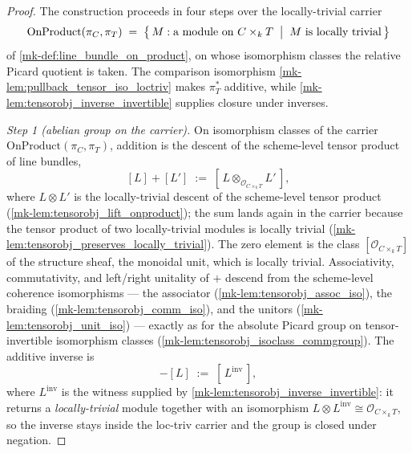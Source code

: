 \begin{proof}
  \leanok


The construction proceeds in four steps over the locally-trivial carrier
  \[
    \mathrm{OnProduct}(\pi_C, \pi_T) \;=\;
      \bigl\{\, M : \text{a module on } C \times_k T \;\bigm|\;
      M \text{ is locally trivial} \,\bigr\}
  \]
  of \ref{mk-def:line_bundle_on_product}, on whose isomorphism classes the
  relative Picard quotient is taken. The comparison isomorphism
  \ref{mk-lem:pullback_tensor_iso_loctriv} makes \(\pi_T^*\) additive, while
  \ref{mk-lem:tensorobj_inverse_invertible} supplies closure under inverses.

  \emph{Step 1 (abelian group on the carrier).} On isomorphism classes of the
  carrier \(\mathrm{OnProduct}(\pi_C, \pi_T)\), addition is the descent of the
  scheme-level tensor product of line bundles,
  \[
    [L] + [L'] \;:=\; [\, L \otimes_{\mathcal{O}_{C \times_k T}} L' \,],
  \]
  where \(L \otimes L'\) is the locally-trivial descent of the scheme-level
  tensor product (\ref{mk-lem:tensorobj_lift_onproduct}); the sum lands again in
  the carrier because the tensor product of two locally-trivial modules is
  locally trivial (\ref{mk-lem:tensorobj_preserves_locally_trivial}). The zero
  element is the class \([\mathcal{O}_{C \times_k T}]\) of the structure sheaf,
  the monoidal unit, which is locally trivial. Associativity, commutativity,
  and left/right unitality of \(+\) descend from the scheme-level coherence
  isomorphisms --- the associator (\ref{mk-lem:tensorobj_assoc_iso}), the
  braiding (\ref{mk-lem:tensorobj_comm_iso}), and the unitors
  (\ref{mk-lem:tensorobj_unit_iso}) --- exactly as for the absolute Picard group
  on tensor-invertible isomorphism classes
  (\ref{mk-lem:tensorobj_isoclass_commgroup}). The additive inverse is
  \[
    -[L] \;:=\; [\, L^{\mathrm{inv}} \,],
  \]
  where \(L^{\mathrm{inv}}\) is the witness supplied by
  \ref{mk-lem:tensorobj_inverse_invertible}: it returns a \emph{locally-trivial}
  module together with an isomorphism
  \(L \otimes L^{\mathrm{inv}} \cong \mathcal{O}_{C \times_k T}\), so the inverse
  stays inside the loc-triv carrier and the group is closed under negation.


\end{proof}
